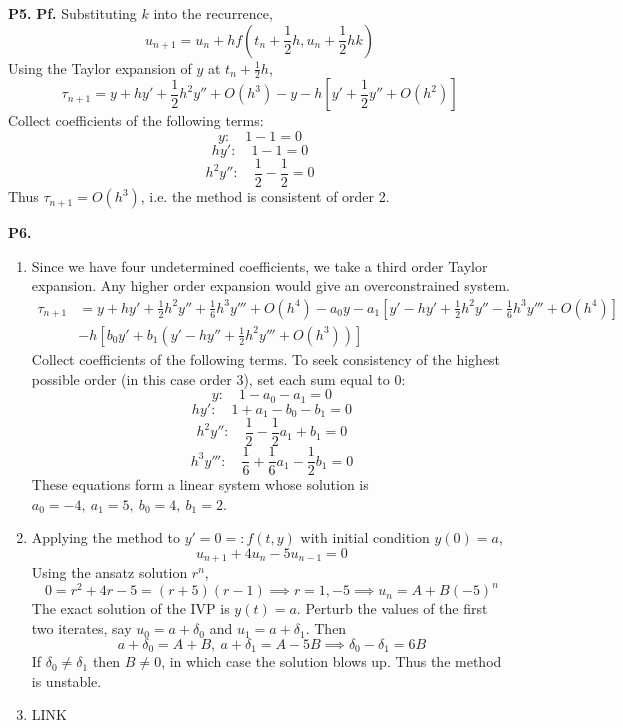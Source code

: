 \documentclass{article}
\def\tbf#1{\textbf{#1}}
\newcommand{\br}[1]{\left(#1\right)}
\newcommand{\sbr}[1]{\left[#1\right]}
\newcommand{\pf}{\tbf{Pf. }}
\newcommand{\imp}{\implies}
\newcommand{\sep}[1][.5cm]{\vspace{#1}}
\begin{document}
\tbf{P5.} \pf Substituting $k$ into the recurrence,
$$u_{n+1} = u_n + hf\br{t_n+\frac12h,u_n+\frac12hk}$$
Using the Taylor expansion of $y$ at $t_n+\frac12h$,
$$\tau_{n+1} = y + hy' + \frac12h^2y'' + O(h^3) - y - h\sbr{y' + \frac12y'' + O(h^2)}$$
Collect coefficients of the following terms:
$$y: \quad 1 - 1 = 0$$
$$hy': \quad 1 - 1 = 0$$
$$h^2y'': \quad \frac12 - \frac12 = 0$$
Thus $\tau_{n+1}=O(h^3)$, i.e. the method is consistent of order 2.
\sep



\tbf{P6.}

\begin{enumerate}[label=(\alph*)]
	
\item Since we have four undetermined coefficients, we take a third order Taylor expansion. Any higher order expansion would give an overconstrained system.
\begin{align*}
	\tau_{n+1} &= y + hy' + \frac12h^2y'' + \frac16h^3y''' + O(h^4) - a_0y - a_1\sbr{y' - hy' + \frac12h^2y'' - \frac16h^3y''' + O(h^4)}\\
	& - h\sbr{b_0y' + b_1\br{y' - hy'' + \frac12h^2y''' + O(h^3)}}
\end{align*}
Collect coefficients of the following terms. To seek consistency of the highest possible order (in this case order 3), set each sum equal to 0:
$$y: \quad 1 - a_0 - a_1 = 0$$
$$hy': \quad 1 + a_1 - b_0 - b_1 = 0$$
$$h^2y'': \quad \frac12 - \frac12a_1 + b_1 = 0$$
$$h^3y''': \quad \frac16+ \frac16a_1 - \frac12b_1 = 0$$
These equations form a linear system whose solution is $a_0=-4,~a_1=5,~b_0=4,~b_1=2$.


\item Applying the method to $y'=0=:f(t,y)$ with initial condition $y(0)=a$,
$$u_{n+1} + 4u_n - 5u_{n-1} = 0$$
Using the ansatz solution $r^n$,
$$0 = r^2+4r-5 = (r+5)(r-1)
\imp r=1,-5
\imp u_n = A + B(-5)^n$$
The exact solution of the IVP is $y(t)=a$. Perturb the values of the first two iterates, say $u_0=a+\delta_0$ and $u_1=a+\delta_1$. Then
$$a+\delta_0 = A+B,~a+\delta_1 = A-5B
\imp \delta_0 - \delta_1 = 6B$$
If $\delta_0\ne\delta_1$ then $B\ne0$, in which case the solution blows up. Thus the method is unstable.

\item LINK

\end{enumerate}
\end{document}
